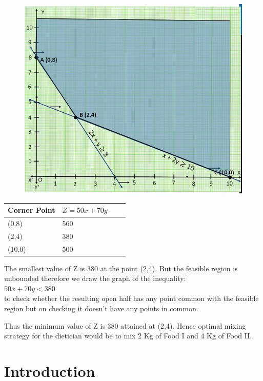 \documentclass{beamer}
\begin{document}
\begin{frame}{}
  \begin{figure}

  \centering
  \includegraphics[width=1\linewidth]{fig.png}
  \end{figure}
\end{frame}



\begin{frame}{}
\begin{table}[]
\begin{tabular}{|l|l|l|l|}
\hline
Corner Point &  $Z=50x+70y$\\
\hline
(0,8)& 560\\
\hline
(2,4)& 380\\
\hline
(10,0)& 500\\
\hline
\end{tabular}
\end{table}
The smallest value of Z is 380 at the point (2,4). But the feasible region is unbounded therefore we draw the graph of the inequality:\\
$50x +70y<380$\\
to check whether the resulting open half has any point common with the feasible region but on checking it doesn't have any points in common. 


\end{frame}

\begin{frame}{}
Thus the minimum value of Z is 380 attained at (2,4). Hence optimal mixing strategy for the dietician would be to mix 2 Kg of Food I and 4 Kg of Food II.
\end{frame}


\section{Introduction}
\end{document}
